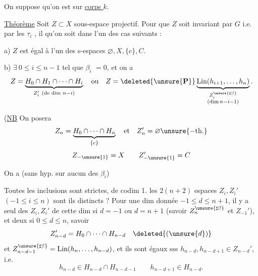 
On suppose qu'on est sur \uline{corps $k$}.


\uline{Théorème} Soit $Z\subset X$ sous-espace projectif. Pour que $Z$ soit invariant par $G$ i.e. par les $\tau_i$ , il  qu'on soit dans l'un des cas suivants :

a) $Z$ est égal à l'un des s-espaces $\varnothing,X,\{c\},C$.

b) $\exists\ 0\leq i\leq n-1$ tel que $\beta_i$  $=0$, et on a
\[
Z=\underbrace{H_0\cap H_1\cap\cdots\cap H_i}_{Z_i'\ (\text{de dim }n-i)}
\quad\text{ou}\quad
Z=\deleted{\unsure{\mathbf P}}\underbrace{\operatorname{Lin}(h_{i+1},\ldots,h_n)}_{\substack{Z_i^{\unsure{\sharp|!}}\\(\dim n-i-1)}}.
\]

(\uline{NB} On posera
\[
Z_n=\underbrace{H_0\cap\cdots\cap H_n}_{\{c\}}
\quad\text{et}\quad Z_n'=\varnothing\unsure{-\mathrm{th}.}
\]
\[
Z_{-\unsure{1}}=X\qquad Z_{-\unsure{1}}'=C
\]

On a (sans hyp. sur aucun des $\beta_i$)


Toutes les inclusions  sont strictes, de codim 1.
 les $2(n+2)$ espaces $Z_i,Z_i'$ $(-1\leq i\leq n)$ sont ils distincts ? Pour une dim donnée $-1\leq d\leq n+1$, il y a   seul des $Z_i,Z_i'$ de cette dim si $d=-1$ ou $d=n+1$ (savoir $Z_n^{\unsure{\sharp|!}}$ et $Z_{-1}'$), et  deux si $0\leq d\leq n$, savoir
\[
Z_{n-d}'=H_0\cap\cdots\cap H_{n-d}
\quad\deleted{(\unsure{d})}
\]
et $Z_{n-d-1}^{\unsure{\sharp|!}}=\operatorname{Lin}(h_n,\ldots,h_{n-d})$, et ils  sont  égaux sss $h_{n-d},h_{n-d+1}\in Z_{n-d}'$, i.e.
\[
h_{n-d}\in H_{n-d}\cap H_{n-d-1}
\qquad
h_{n-d+1}\in H_{n-d}.
\]



